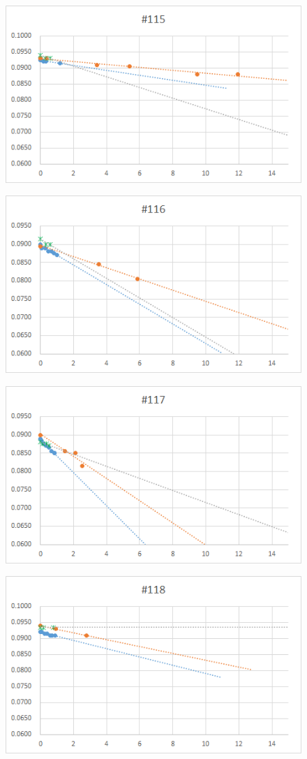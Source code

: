   \begin{figure}[htbp]
    \centering
       \includegraphics[width=120mm]{vol_115.png}
  \end{figure}
  \begin{figure}[htbp]
    \centering
       \includegraphics[width=120mm]{vol_116.png}
  \end{figure}
  \begin{figure}[htbp]
    \centering
       \includegraphics[width=120mm]{vol_117.png}
  \end{figure}
  \begin{figure}[htbp]
    \centering
       \includegraphics[width=120mm]{vol_118.png}
  \end{figure}